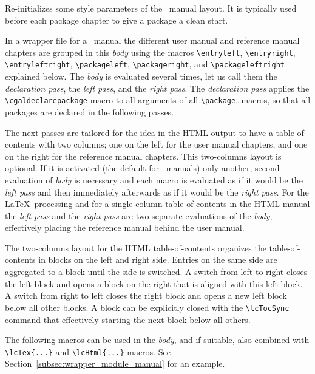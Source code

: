 \begin{description}
    Re-initializes some style parameters of the \CC\ manual layout. It
    is typically used before each package chapter to give a package a
    clean start.

    In a wrapper file for a \cgal\ manual the different user manual
    and reference manual chapters are grouped in this \emph{body\/} using the
    macros \verb|\entryleft|, \verb|\entryright|, \verb|\entryleftright|,
    \verb|\packageleft|, \verb|\packageright|, and
    \verb|\packageleftright| explained below. The \emph{body\/} is
    evaluated several times, let us call them the \emph{declaration pass},
    the \emph{left pass}, and the \emph{right pass}. The \emph{declaration
      pass\/} applies the \verb|\cgaldeclarepackage| macro to all arguments
    of all \verb|\package|\ldots macros, so that all packages are declared in
    the following passes.

    The next passes are tailored for the
    idea in the HTML output to have a table-of-contents with two
    columns; one on the left for the user manual chapters, and one on
    the right for the reference manual chapters. This two-columns
    layout is optional. If it is activated (the default for \cgal\
    manuals) only another, second evaluation of \emph{body\/} is
    necessary and each macro is evaluated as if it would be the
    \emph{left pass} and then immediately afterwards as if it would be
    the \emph{right pass}. For the \LaTeX\ processing and for a single-column
    table-of-contents in the HTML manual the \emph{left pass} and the
    \emph{right pass} are two separate evaluations of the \emph{body},
    effectively placing the reference manual behind the user manual.

    The two-columns layout for the HTML table-of-contents organizes
    the table-of-contents in blocks on the left and right
    side. Entries on the same side are aggregated to a block until the
    side is switched. A switch from left to right closes the left
    block and opens a block on the right that is aligned with this left block.
    A switch from right to left closes the right block and opens a new
    left block below all other blocks.
    A block can be explicitly closed with the \verb|\lcTocSync|
    command that effectively starting the next block below all others.

    The following macros can be used in the \emph{body}, and if
    suitable, also combined with \verb|\lcTex{...}| and
    \verb|\lcHtml{...}| macros. See Section~\ref{subsec:wrapper_module_manual}
    for an example.


\end{description}
